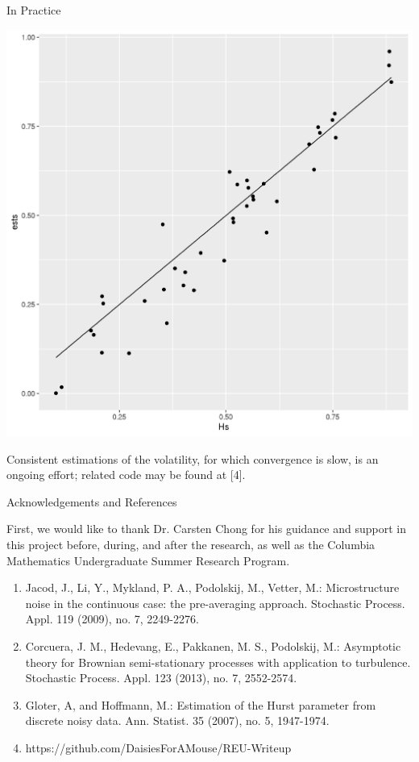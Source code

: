 \documentclass[final,hyperref={pdfpagelabels=false}]{beamer}
\begin{document}
\begin{frame}{}
\begin{columns}[t]
\begin{column}{0.28\linewidth}
\begin{block}{In Practice}
          \begin{center}
            \includegraphics[width=15cm]{./hests.png}
          \end{center}
          Consistent estimations of the volatility, for which convergence is slow, is an ongoing effort; related code may be found at [4].
        \end{block}
        \begin{block}{Acknowledgements and References}
          {\footnotesize
            First, we would like to thank Dr. Carsten Chong for his guidance and support in this project before, during, and after the research, as well as the Columbia Mathematics Undergraduate Summer Research Program.
          \begin{enumerate}
            \item Jacod, J., Li, Y., Mykland, P. A., Podolskij, M., Vetter, M.: Microstructure noise in the continuous case: the pre-averaging approach. Stochastic Process. Appl. 119 (2009), no. 7, 2249-2276.
            \item Corcuera, J. M., Hedevang, E., Pakkanen, M. S., Podolskij, M.: Asymptotic theory for Brownian semi-stationary processes with application to turbulence. Stochastic Process. Appl. 123 (2013), no. 7, 2552-2574.
            \item Gloter, A, and Hoffmann, M.: Estimation of the Hurst parameter from discrete noisy data. Ann. Statist. 35 (2007), no. 5, 1947-1974.
            \item https://github.com/DaisiesForAMouse/REU-Writeup
          \end{enumerate}
        }
        \end{block}

      \end{column}
    \end{columns}
  \end{frame}
\end{document}
